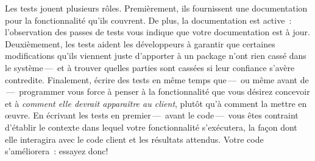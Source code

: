 \documentclass[a4paper,10pt,twoside]{book}
\begin{document}
Les tests jouent plusieurs rôles. Premièrement, ils fournissent une
documentation pour la fonctionnalité qu'ils couvrent. De plus, la
documentation est active~: l'observation des passes de tests vous
indique que votre documentation est à jour. Deuxièmement, les tests
aident les développeurs à garantir que certaines modifications qu'ils
viennent juste d'apporter à un package n'ont rien cassé dans le
système\,---\, et à trouver quelles parties sont cassées si leur
confiance s'avère contredite. Finalement, écrire des tests en même
temps que\,---\, ou même avant de \,---\,  programmer vous force à
penser à la fonctionnalité que vous désirez concevoir et à
\emph{comment elle devrait apparaître au client}, plutôt qu'à comment
la mettre en {\oe}uvre. En écrivant les tests en premier\,---\, avant
le code\,---\, vous êtes contraint d'établir le contexte dans lequel
votre fonctionnalité s'exécutera, la façon dont elle interagira avec
le code client et les résultats attendus. Votre code s'améliorera~:
essayez donc!
 

\end{document}
